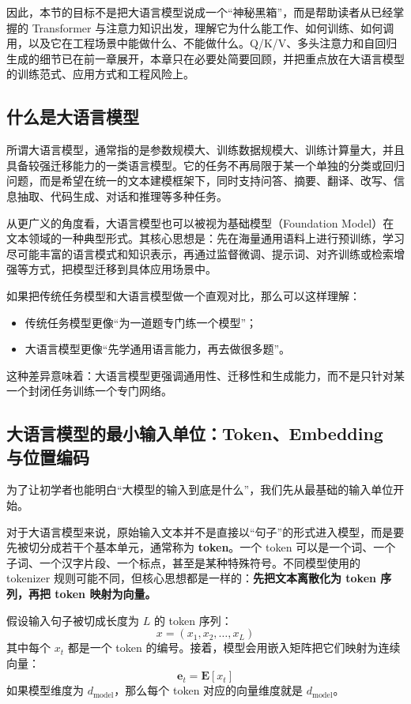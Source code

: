 因此，本节的目标不是把大语言模型说成一个“神秘黑箱”，而是帮助读者从已经掌握的 Transformer 与注意力知识出发，理解它为什么能工作、如何训练、如何调用，以及它在工程场景中能做什么、不能做什么。Q/K/V、多头注意力和自回归生成的细节已在前一章展开，本章只在必要处简要回顾，并把重点放在大语言模型的训练范式、应用方式和工程风险上。

\subsection{什么是大语言模型}

所谓大语言模型，通常指的是参数规模大、训练数据规模大、训练计算量大，并且具备较强迁移能力的一类语言模型。它的任务不再局限于某一个单独的分类或回归问题，而是希望在统一的文本建模框架下，同时支持问答、摘要、翻译、改写、信息抽取、代码生成、对话和推理等多种任务。

从更广义的角度看，大语言模型也可以被视为基础模型（Foundation Model）在文本领域的一种典型形式。其核心思想是：先在海量通用语料上进行预训练，学习尽可能丰富的语言模式和知识表示，再通过监督微调、提示词、对齐训练或检索增强等方式，把模型迁移到具体应用场景中。

如果把传统任务模型和大语言模型做一个直观对比，那么可以这样理解：

\begin{itemize}
    \item 传统任务模型更像“为一道题专门练一个模型”；
    \item 大语言模型更像“先学通用语言能力，再去做很多题”。
\end{itemize}

这种差异意味着：大语言模型更强调通用性、迁移性和生成能力，而不是只针对某一个封闭任务训练一个专门网络。

\subsection{大语言模型的最小输入单位：Token、Embedding 与位置编码}

为了让初学者也能明白“大模型的输入到底是什么”，我们先从最基础的输入单位开始。

对于大语言模型来说，原始输入文本并不是直接以“句子”的形式进入模型，而是要先被切分成若干个基本单元，通常称为 \textbf{token}。一个 token 可以是一个词、一个子词、一个汉字片段、一个标点，甚至是某种特殊符号。不同模型使用的 tokenizer 规则可能不同，但核心思想都是一样的：\textbf{先把文本离散化为 token 序列，再把 token 映射为向量。}

假设输入句子被切成长度为 $L$ 的 token 序列：
\[
x = (x_1, x_2, \dots, x_L)
\]
其中每个 $x_t$ 都是一个 token 的编号。接着，模型会用嵌入矩阵把它们映射为连续向量：
\[
\mathbf{e}_t = \mathbf{E}[x_t]
\]
如果模型维度为 $d_{\text{model}}$，那么每个 token 对应的向量维度就是 $d_{\text{model}}$。

